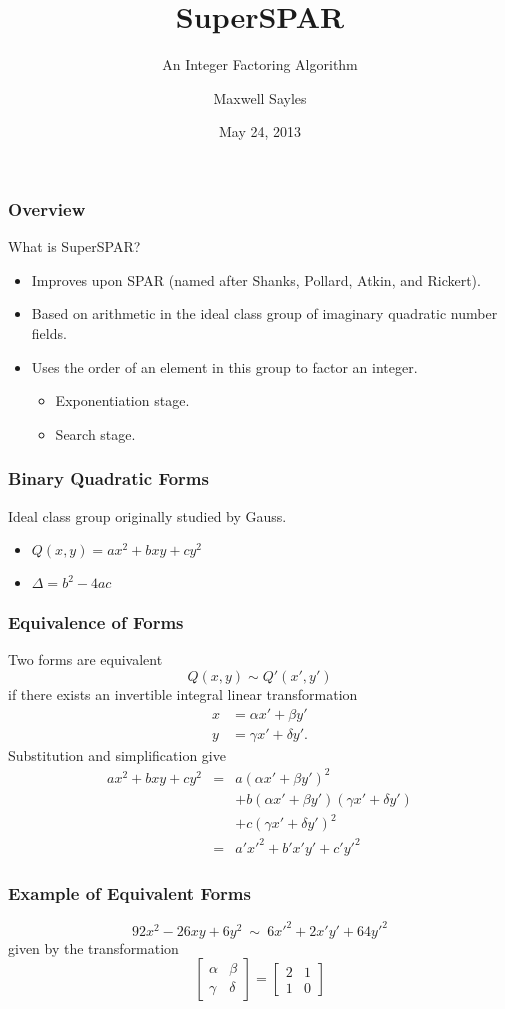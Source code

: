 \documentclass{beamer}
\title[]{SuperSPAR}
\subtitle{An Integer Factoring Algorithm}
\author{Maxwell Sayles}
\date{May 24, 2013}
\institute{
	\bigskip 
       Department of Computer Science \\
       University of Calgary
}
\newcommand{\matrixtt}[4]{\left[ \begin{array}{rr} #1 & #2 \\ #3 & #4 \end{array} \right]}
\begin{document}
\maketitle

\begin{frame}
\frametitle{Overview}
What is SuperSPAR?
\begin{itemize}
\item Improves upon SPAR (named after Shanks, Pollard, Atkin, and Rickert).
\item Based on arithmetic in the ideal class group of imaginary quadratic number fields.
\item Uses the order of an element in this group to factor an integer.
\begin{itemize}
\item Exponentiation stage.
\item Search stage.
\end{itemize}
\end{itemize}
\end{frame}

\begin{frame}
\frametitle{Binary Quadratic Forms}
Ideal class group originally studied by Gauss.
\begin{itemize}
\item $Q(x, y) = ax^2 + bxy + cy^2$
\item $\Delta = b^2 - 4ac$
\end{itemize}
\end{frame}

\begin{frame}
\frametitle{Equivalence of Forms}
Two forms are equivalent
\[
Q(x, y) \sim Q'(x',y')
\]
if there exists an invertible integral linear transformation
\begin{align*}
x &= \alpha x' + \beta y' \\
y &= \gamma x' + \delta y'.
\end{align*}
Substitution and simplification give
\begin{eqnarray*}
ax^2 + bxy + cy^2
	&=& a(\alpha x' + \beta y')^2 \\
	&& + b(\alpha x' + \beta y')(\gamma x' + \delta y') \\
	&& + c(\gamma x' + \delta y')^2 \\
	&=& a'{x'}^2 + b'x'y' + c'{y'}^2
\end{eqnarray*}
\end{frame}

\begin{frame}
\frametitle{Example of Equivalent Forms}
\[
92x^2-26xy+6y^2 ~ \sim ~ 6{x'}^2+2x'y'+64{y'}^2
\]
given by the transformation
\[
\matrixtt{\alpha}{\beta}{\gamma}{\delta} = \matrixtt{2}{1}{1}{0}
\]
\end{frame}
\end{document}
